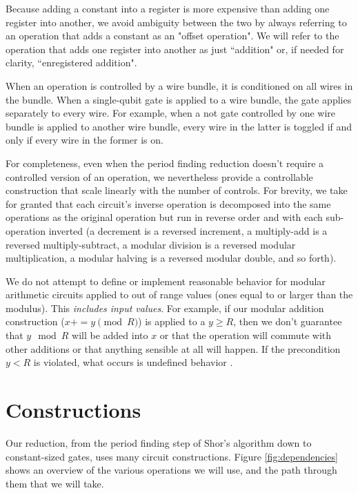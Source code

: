 \documentclass[twocolumn]{article}
\begin{document}
Because adding a constant into a register is more expensive than adding one register into another, we avoid ambiguity between the two by always referring to an operation that adds a constant as an "offset operation".
We will refer to the operation that adds one register into another as just ``addition" or, if needed for clarity, ``enregistered addition".

When an operation is controlled by a wire bundle, it is conditioned on all wires in the bundle.
When a single-qubit gate is applied to a wire bundle, the gate applies separately to every wire.
For example, when a not gate controlled by one wire bundle is applied to another wire bundle, every wire in the latter is toggled if and only if every wire in the former is on.

For completeness, even when the period finding reduction doesn't require a controlled version of an operation, we nevertheless provide a controllable construction that scale linearly with the number of controls.
For brevity, we take for granted that each circuit's inverse operation is decomposed into the same operations as the original operation but run in reverse order and with each sub-operation inverted (a decrement is a reversed increment, a multiply-add is a reversed multiply-subtract, a modular division is a reversed modular multiplication, a modular halving is a reversed modular double, and so forth).

We do not attempt to define or implement reasonable behavior for modular arithmetic circuits applied to out of range values (ones equal to or larger than the modulus).
This {\em includes input values}.
For example, if our modular addition construction ($x \mathrel{{+}{=}} y \pmod{R}$) is applied to a $y \geq R$, then we don't guarantee that $y \mod R$ will be added into $x$ or that the operation will commute with other additions or that anything sensible at all will happen.
If the precondition $y < R$ is violated, what occurs is undefined behavior \cite{c11}.


\section{Constructions} \label{sec:construct}

Our reduction, from the period finding step of Shor's algorithm down to constant-sized gates, uses many circuit constructions.
Figure \ref{fig:dependencies} shows an overview of the various operations we will use, and the path through them that we will take.
\end{document}
